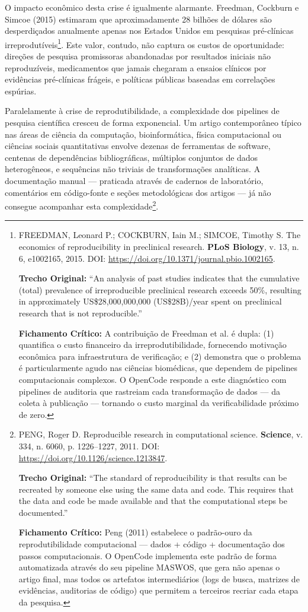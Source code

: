 O impacto econômico desta crise é igualmente alarmante. Freedman, Cockburn e Simcoe (2015) estimaram que aproximadamente 28 bilhões de dólares são desperdiçados anualmente apenas nos Estados Unidos em pesquisas pré-clínicas irreprodutíveis\footnote{
  FREEDMAN, Leonard P.; COCKBURN, Iain M.; SIMCOE, Timothy S. The economics of reproducibility in preclinical research. \textbf{PLoS Biology}, v. 13, n. 6, e1002165, 2015. DOI: \url{https://doi.org/10.1371/journal.pbio.1002165}.

  \textbf{Trecho Original:} ``An analysis of past studies indicates that the cumulative (total) prevalence of irreproducible preclinical research exceeds 50\%, resulting in approximately US\$28,000,000,000 (US\$28B)/year spent on preclinical research that is not reproducible.''

  \textbf{Fichamento Crítico:} A contribuição de Freedman et al. é dupla: (1) quantifica o custo financeiro da irreprodutibilidade, fornecendo motivação econômica para infraestrutura de verificação; e (2) demonstra que o problema é particularmente agudo nas ciências biomédicas, que dependem de pipelines computacionais complexos. O OpenCode responde a este diagnóstico com pipelines de auditoria que rastreiam cada transformação de dados --- da coleta à publicação --- tornando o custo marginal da verificabilidade próximo de zero.
}. Este valor, contudo, não captura os custos de oportunidade: direções de pesquisa promissoras abandonadas por resultados iniciais não reproduzíveis, medicamentos que jamais chegaram a ensaios clínicos por evidências pré-clínicas frágeis, e políticas públicas baseadas em correlações espúrias.

Paralelamente à crise de reprodutibilidade, a complexidade dos pipelines de pesquisa científica cresceu de forma exponencial. Um artigo contemporâneo típico nas áreas de ciência da computação, bioinformática, física computacional ou ciências sociais quantitativas envolve dezenas de ferramentas de software, centenas de dependências bibliográficas, múltiplos conjuntos de dados heterogêneos, e sequências não triviais de transformações analíticas. A documentação manual --- praticada através de cadernos de laboratório, comentários em código-fonte e seções metodológicas dos artigos --- já não consegue acompanhar esta complexidade\footnote{
  PENG, Roger D. Reproducible research in computational science. \textbf{Science}, v. 334, n. 6060, p. 1226--1227, 2011. DOI: \url{https://doi.org/10.1126/science.1213847}.

  \textbf{Trecho Original:} ``The standard of reproducibility is that results can be recreated by someone else using the same data and code. This requires that the data and code be made available and that the computational steps be documented.''

  \textbf{Fichamento Crítico:} Peng (2011) estabelece o padrão-ouro da reprodutibilidade computacional --- dados + código + documentação dos passos computacionais. O OpenCode implementa este padrão de forma automatizada através do seu pipeline MASWOS, que gera não apenas o artigo final, mas todos os artefatos intermediários (logs de busca, matrizes de evidências, auditorias de código) que permitem a terceiros recriar cada etapa da pesquisa.
}.

